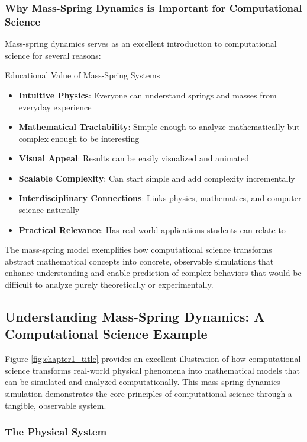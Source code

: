\subsubsection{Why Mass-Spring Dynamics is Important for Computational Science}

Mass-spring dynamics serves as an excellent introduction to computational science for several reasons:

\begin{highlightbox}{Educational Value of Mass-Spring Systems}
\begin{itemize}
    \item \textbf{Intuitive Physics}: Everyone can understand springs and masses from everyday experience
    \item \textbf{Mathematical Tractability}: Simple enough to analyze mathematically but complex enough to be interesting
    \item \textbf{Visual Appeal}: Results can be easily visualized and animated
    \item \textbf{Scalable Complexity}: Can start simple and add complexity incrementally
    \item \textbf{Interdisciplinary Connections}: Links physics, mathematics, and computer science naturally
    \item \textbf{Practical Relevance}: Has real-world applications students can relate to
\end{itemize}
\end{highlightbox}

The mass-spring model exemplifies how computational science transforms abstract mathematical concepts into concrete, observable simulations that enhance understanding and enable prediction of complex behaviors that would be difficult to analyze purely theoretically or experimentally.

\subsection{Understanding Mass-Spring Dynamics: A Computational Science Example}

Figure \ref{fig:chapter1_title} provides an excellent illustration of how computational science transforms real-world physical phenomena into mathematical models that can be simulated and analyzed computationally. This mass-spring dynamics simulation demonstrates the core principles of computational science through a tangible, observable system.

\subsubsection{The Physical System}

